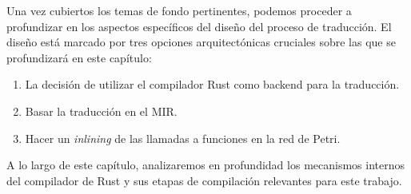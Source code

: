 Una vez cubiertos los temas de fondo pertinentes, podemos proceder a profundizar en los
aspectos específicos del diseño del proceso de traducción. El diseño está marcado por tres
opciones arquitectónicas cruciales sobre las que se profundizará en este capítulo:

\begin{enumerate}
    \item La decisión de utilizar el compilador Rust como backend para la traducción.
    \item Basar la traducción en el \acrfull{MIR}.
    \item Hacer un \textit{inlining} de las llamadas a funciones en la red de Petri.
\end{enumerate}

A lo largo de este capítulo, analizaremos en profundidad los mecanismos internos del
compilador de Rust y sus etapas de compilación relevantes para este trabajo.